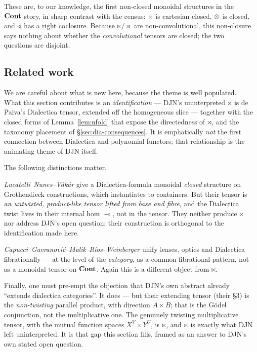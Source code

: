 These are, to our knowledge, the first non-closed monoidal structures in the
$\mathbf{Cont}$ story, in sharp contrast with the census: $\times$ is cartesian closed,
$\mathbin{\otimes}$ is closed, and $\mathbin{\triangleleft}$ has a right coclosure. Because $\ltimes/\rtimes$ are
non-convolutional, this non-closure says nothing about whether the
\emph{convolutional} tensors are closed; the two questions are disjoint.

\subsection{Related work}
\label{sec:dia-related}

We are careful about what is new here, because the theme is well populated. What
this section contributes is an \emph{identification} --- DJN's uninterpreted
$\ltimes$ is de Paiva's Dialectica tensor, extended off the homogeneous slice ---
together with the closed forms of Lemma~\ref{lem:nfold} that expose the
directedness of $\rtimes$, and the taxonomy placement of
§\ref{sec:dia-consequences}. It is emphatically \emph{not} the first connection
between Dialectica and polynomial functors; that relationship is the animating
theme of DJN itself.

The following distinctions matter.

\emph{Lucatelli~Nunes--Vákár \cite{lnv2405}} give a Dialectica-formula monoidal
\emph{closed} structure on Grothendieck constructions, which instantiates to
containers. But their tensor is \emph{an untwisted, product-like tensor lifted
from base and fibre}, and the Dialectica
twist lives in their internal hom $\multimap$, not in the tensor. They neither
produce $\ltimes$ nor address DJN's open question; their construction is
orthogonal to the identification made here.

\emph{Capucci--Gavranović--Malik--Rios--Weinberger \cite{capucci2024}} unify
lenses, optics and Dialectica fibrationally --- at the level of the
\emph{category}, as a common fibrational pattern, not as a monoidal tensor on
$\mathbf{Cont}$. Again this is a different object from $\ltimes$.

Finally, one must pre-empt the objection that DJN's own abstract already
``extends dialectica categories''. It does --- but their extending tensor (their
\S3) is the \emph{non-twisting} parallel product, with direction $A\times B$;
that is the Gödel conjunction, not the multiplicative one. The genuinely
twisting multiplicative tensor, with the mutual function spaces $X^{V}\times
Y^{U}$, is $\ltimes$, and $\ltimes$ is exactly what DJN left uninterpreted. It is
that gap this section fills, framed as an answer to DJN's own stated open
question.

